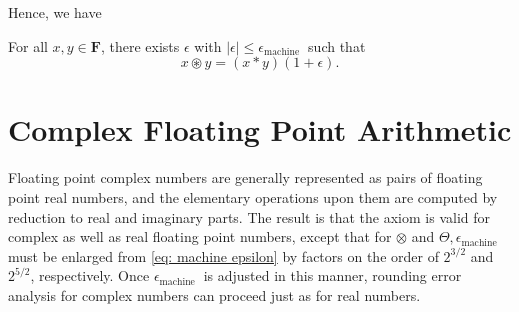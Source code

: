 Hence, we have 

\begin{theorem}
\label{thm: Fundamental Axiom of FPA}
For all $x, y \in \mathbf{F}$, there exists $\epsilon$ with $|\epsilon| \leq \epsilon_{\text {machine }}$ such that
\begin{equation}
    \label{eq:flop} 
    x \circledast y=(x * y)(1+\epsilon).
\end{equation}
\end{theorem}

\section{Complex Floating Point Arithmetic} 
Floating point complex numbers are generally represented as pairs of floating point real numbers, and the elementary operations upon them are computed by reduction to real and imaginary parts. The result is that the axiom is valid for complex as well as real floating point numbers, except that for $\otimes$ and $\Theta, \epsilon_{\text {machine }}$ must be enlarged from \autoref{eq: machine epsilon} by factors on the order of $2^{3 / 2}$ and $2^{5 / 2}$, respectively. Once $\epsilon_{\text {machine }}$ is adjusted in this manner, rounding error analysis for complex numbers can proceed just as for real numbers.

